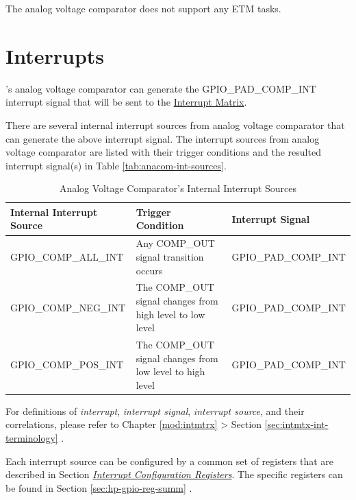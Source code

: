 \documentclass[main\_\_EN.tex]{subfiles}
\begin{document}
The analog voltage comparator does not support any ETM tasks.



\section{Interrupts}

\chipname{}'s analog voltage comparator can generate the GPIO\_PAD\_COMP\_INT interrupt signal that will be sent to the \hyperref[mod:intmtrx]{Interrupt Matrix}.

There are several internal interrupt sources from analog voltage comparator that can generate the above interrupt signal. The interrupt sources from analog voltage comparator are listed with their trigger conditions and the resulted interrupt signal(s) in Table \ref{tab:anacom-int-sources}.

\begin{longtable}{ | L{5.5cm} | L{6cm} | L{4cm} | }
\caption{Analog Voltage Comparator's Internal Interrupt Sources} \label{tab:anacom-int-sources}
\\ \hline
{}
\textbf{Internal Interrupt Source} & \textbf{Trigger Condition}  &  \textbf{Interrupt Signal}\\ \hline
\label{int:GPIOCOMPnALLINT}GPIO\_COMP\_ALL\_INT & Any COMP\_OUT signal transition occurs &  GPIO\_PAD\_COMP\_INT  \\ \hline
\label{int:GPIOCOMPnNEGINT}GPIO\_COMP\_NEG\_INT & The COMP\_OUT signal changes from high level to low level  & GPIO\_PAD\_COMP\_INT \\ \hline
\label{int:GPIOCOMPnPOSINT}GPIO\_COMP\_POS\_INT &  The COMP\_OUT signal changes from low level to high level & GPIO\_PAD\_COMP\_INT \\ \hline
\end{longtable}

\begin{tiplisting}
For definitions of \textit{interrupt}, \textit{interrupt signal}, \textit{interrupt source}, and their correlations, please refer to Chapter \ref{mod:intmtrx} \textit{} > Section \ref{sec:intmtx-int-terminology} \textit{}.
\end{tiplisting}

Each interrupt source can be configured by a common set of registers that are described in Section \hyperref[interrupt-config-registers]{\textit{Interrupt Configuration Registers}}. The specific registers can be found in Section \ref{sec:hp-gpio-reg-summ} \textit{}.
\end{document}
